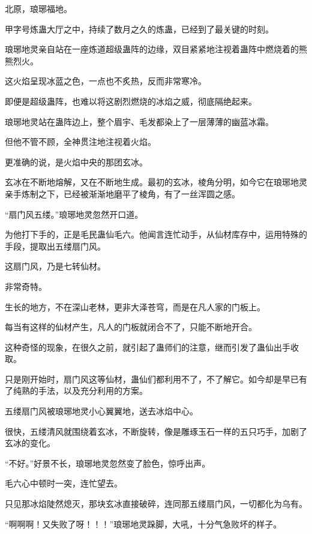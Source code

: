 
\begin{this_body}



北原，琅琊福地。

甲字号炼蛊大厅之中，持续了数月之久的炼蛊，已经到了最关键的时刻。

琅琊地灵亲自站在一座炼道超级蛊阵的边缘，双目紧紧地注视着蛊阵中燃烧着的熊熊烈火。

这火焰呈现冰蓝之色，一点也不炙热，反而非常寒冷。

即便是超级蛊阵，也难以将这剧烈燃烧的冰焰之威，彻底隔绝起来。

琅琊地灵站在蛊阵边上，整个眉宇、毛发都染上了一层薄薄的幽蓝冰霜。

但他不管不顾，全神贯注地注视着火焰。

更准确的说，是火焰中央的那团玄冰。

玄冰在不断地熔解，又在不断地生成。最初的玄冰，棱角分明，如今它在琅琊地灵亲手炼制之下，已经被渐渐地磨平了棱角，有了一丝浑圆之感。

“扇门风五缕。”琅琊地灵忽然开口道。

为他打下手的，正是毛民蛊仙毛六。他闻言连忙动手，从仙材库存中，运用特殊的手段，提取出五缕扇门风。

这扇门风，乃是七转仙材。

非常奇特。

生长的地方，不在深山老林，更非大泽苍穹，而是在凡人家的门板上。

每当有这样的仙材产生，凡人的门板就闭合不了，只能不断地开合。

这种奇怪的现象，在很久之前，就引起了蛊师们的注意，继而引发了蛊仙出手收取。

只是刚开始时，扇门风这等仙材，蛊仙们都利用不了，不了解它。如今却是早已有了纯熟的手法，以及充分利用的方案。

五缕扇门风被琅琊地灵小心翼翼地，送去冰焰中心。

很快，五缕清风就围绕着玄冰，不断旋转，像是雕琢玉石一样的五只巧手，加剧了玄冰的变化。

“不好。”好景不长，琅琊地灵忽然变了脸色，惊呼出声。

毛六心中顿时一突，连忙望去。

只见那冰焰陡然熄灭，那块玄冰直接破碎，连同那五缕扇门风，一切都化为乌有。

“啊啊啊！又失败了呀！！！”琅琊地灵跺脚，大吼，十分气急败坏的样子。


\end{this_body}
